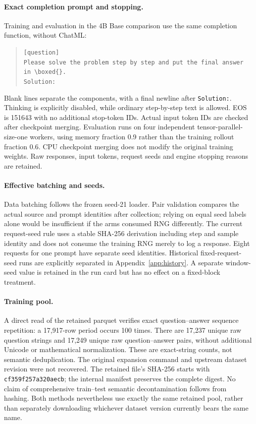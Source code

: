 \paragraph{Exact completion prompt and stopping.}
Training and evaluation in the 4B Base comparison use the same completion function, without ChatML:
\begin{quote}\small
\texttt{[question]}\\
\texttt{Please solve the problem step by step and put the final answer in}\ \verb|\boxed{}.|\\
\texttt{Solution:}
\end{quote}
Blank lines separate the components, with a final newline after \texttt{Solution:}. Thinking is explicitly disabled, while ordinary step-by-step text is allowed. EOS is 151643 with no additional stop-token IDs. Actual input token IDs are checked after checkpoint merging. Evaluation runs on four independent tensor-parallel-size-one workers, using memory fraction 0.9 rather than the training rollout fraction 0.6. CPU checkpoint merging does not modify the original training weights. Raw responses, input tokens, request seeds and engine stopping reasons are retained.

\paragraph{Effective batching and seeds.}
Data batching follows the frozen seed-21 loader. Pair validation compares the actual source and prompt identities after collection; relying on equal seed labels alone would be insufficient if the arms consumed RNG differently. The current request-seed rule uses a stable SHA-256 derivation including step and sample identity and does not consume the training RNG merely to log a response. Eight requests for one prompt have separate seed identities. Historical fixed-request-seed runs are explicitly separated in Appendix~\ref{app:history}. A separate window-seed value is retained in the run card but has no effect on a fixed-block treatment.

\paragraph{Training pool.}
A direct read of the retained parquet verifies exact question--answer sequence repetition: a 17,917-row period occurs 100 times. There are 17,237 unique raw question strings and 17,249 unique raw question--answer pairs, without additional Unicode or mathematical normalization. These are exact-string counts, not semantic deduplication. The original expansion command and upstream dataset revision were not recovered. The retained file's SHA-256 starts with \texttt{cf359f257a320aecb}; the internal manifest preserves the complete digest. No claim of comprehensive train--test semantic decontamination follows from hashing. Both methods nevertheless use exactly the same retained pool, rather than separately downloading whichever dataset version currently bears the same name.

